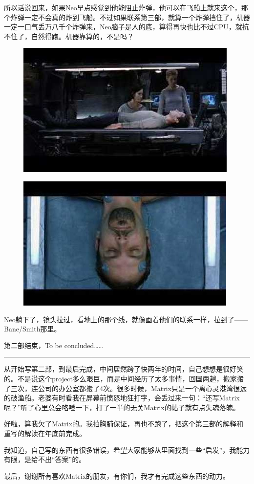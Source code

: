 \documentclass[UTF8]{ctexart}
\newcommand{\myparsep}{\noindent \rule[0.5ex]{\linewidth}{1pt}}
\begin{document}
所以话说回来，如果Neo早点感觉到他能阻止炸弹，他可以在飞船上就来这个，那个炸弹一定不会真的炸到飞船。不过如果联系第三部，就算一个炸弹挡住了，机器一定一口气丢万八千个炸弹来，Neo脑子是人的底，算得再快也比不过CPU，就抗不住了，自然得跑。机器靠算的，不是吗？

\begin{figure}[htb]
\centering
\includegraphics[width=0.5\linewidth]{fig/read_reloaded-178}
\end{figure}

\begin{figure}[htb]
\centering
\includegraphics[width=0.5\linewidth]{fig/read_reloaded-178-1}
\end{figure}

Neo躺下了，镜头拉过，看地上的那个线，就像画着他们的联系一样，拉到了——Bane/Smith那里。

第二部结束，To be concluded……

\myparsep

从开始写第二部，到最后完成，中间居然跨了快两年的时间，自己想想是很好笑的。不是说这个project多么艰巨，而是中间经历了太多事情，回国两趟，搬家搬了三次，连公司的办公室都搬了4次。很多时候，Matrix只是一个离心灵港湾很远的破渔船。老婆有时看我在屏幕前愤怒地狂打字，会丢过来一句：“还写Matrix呢？”听了心里总会咯噔一下，打了一半的无关Matrix的帖子就有点失魂落魄。

好啦，算我欠了Matrix的。我拍胸脯保证，再也不跑了，把这个第三部的解释和重写的解读在年底前完成。

我知道，自己写的东西有很多错误，希望大家能够从里面找到一些“启发”，我能力有限，是给不出“答案”的。

最后，谢谢所有喜欢Matrix的朋友，有你们，我才有完成这些东西的动力。
\end{document}
